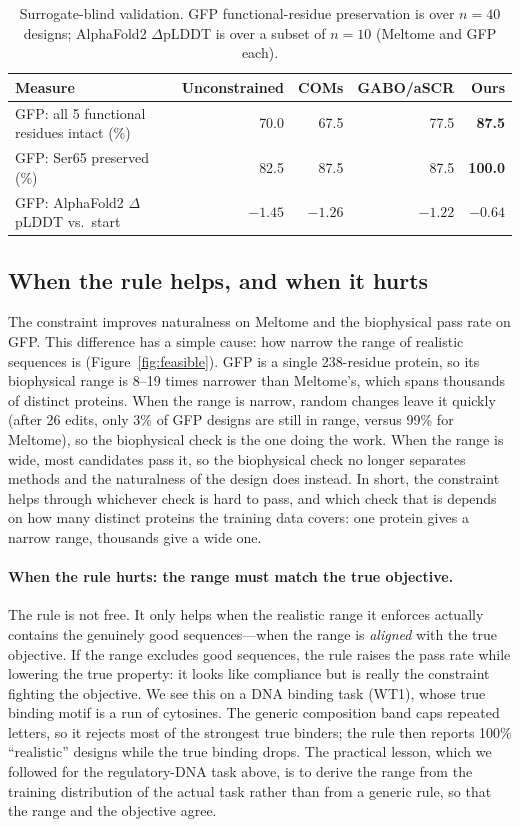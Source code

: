 \documentclass{article}
\begin{document}
\begin{table}[t]
\centering\small
\caption{Surrogate-blind validation. GFP functional-residue preservation is over $n=40$
designs; AlphaFold2 $\Delta$pLDDT is over a subset of $n=10$ (Meltome and GFP each).}
\label{tab:validation}
\begin{tabular}{lrrrr}
\toprule
Measure & Unconstrained & COMs & GABO/aSCR & Ours \\
\midrule
GFP: all 5 functional residues intact (\%) & 70.0 & 67.5 & 77.5 & \textbf{87.5} \\
GFP: Ser65 preserved (\%) & 82.5 & 87.5 & 87.5 & \textbf{100.0} \\
GFP: AlphaFold2 $\Delta$pLDDT vs.\ start & $-1.45$ & $-1.26$ & $-1.22$ & $\mathbf{-0.64}$ \\
\bottomrule
\end{tabular}
\end{table}

\subsection{When the rule helps, and when it hurts}

The constraint improves naturalness on Meltome and the biophysical pass rate on GFP. This
difference has a simple cause: how narrow the range of realistic sequences is
(Figure~\ref{fig:feasible}). GFP is a single 238-residue protein, so its biophysical range
is 8--19 times narrower than Meltome's, which spans thousands of distinct proteins. When the
range is
narrow, random changes leave it quickly (after 26 edits, only 3\% of GFP designs are still
in range, versus 99\% for Meltome), so the biophysical check is the one doing the work. When
the range is wide, most candidates pass it, so the biophysical check no longer separates
methods and the naturalness of the design does instead. In short, the constraint helps
through whichever check is hard to pass, and which check that is depends on how many
distinct proteins the training data covers: one protein gives a narrow range, thousands
give a wide one.

\paragraph{When the rule hurts: the range must match the true objective.}
The rule is not free. It only helps when the realistic range it enforces actually contains
the genuinely good sequences---when the range is \emph{aligned} with the true objective. If
the range excludes good sequences, the rule raises the pass rate while lowering the true
property: it looks like compliance but is really the constraint fighting the objective. We
see this on a DNA binding task (WT1), whose true binding motif is a run of cytosines. The
generic composition band caps repeated letters, so it rejects most of the strongest true
binders; the rule then reports 100\% ``realistic'' designs while the true binding drops. The
practical lesson, which we followed for the regulatory-DNA task above, is to derive the
range from the training distribution of the actual task rather than from a generic rule, so
that the range and the objective agree.
\end{document}
